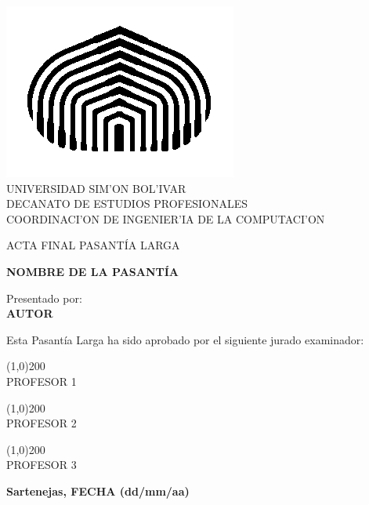 \begin{titlepage}
\begin{center}

\includegraphics[scale=0.5,type=png,ext=.png,read=.png]{figures/cebolla} \\

\textsc {\large UNIVERSIDAD SIM'ON BOL'IVAR} \\
\textsc{DECANATO DE ESTUDIOS PROFESIONALES\\
COORDINACI'ON DE INGENIER'IA DE LA COMPUTACI'ON}

\bigskip
\bigskip
\bigskip
\bigskip
\bigskip
\bigskip

\textsc{ACTA FINAL PASANT\'IA LARGA}

\bigskip
\bigskip

\textsc{\bfseries NOMBRE DE LA PASANT\'IA}

\bigskip
\bigskip
\bigskip
\bigskip

\begin{minipage}{\textwidth}
\centering
Presentado por: \\
\textsc{\bfseries AUTOR} \\

\bigskip
\bigskip
\bigskip
\bigskip

Esta Pasant\'ia Larga ha sido aprobado por el siguiente jurado examinador: \\

\bigskip
\bigskip

\line(1,0){200} \\
PROFESOR 1\\

\bigskip
\bigskip

\line(1,0){200} \\
PROFESOR 2 \\

\bigskip
\bigskip

\line(1,0){200} \\
PROFESOR 3 \\
\end{minipage}

\bigskip
\bigskip
\vfill

{\large \bfseries Sartenejas, FECHA (dd/mm/aa)}

\end{center}
\end{titlepage}
